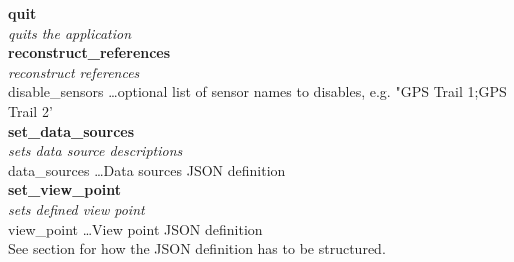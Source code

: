 \textbf{quit} \\
\textit{quits the application} \\

\textbf{reconstruct\_references} \\
\textit{reconstruct references} \\
disable\_sensors \dots optional list of sensor names to disables, e.g. "GPS Trail 1;GPS Trail 2' \\

\textbf{set\_data\_sources} \\
\textit{sets data source descriptions} \\
data\_sources \dots Data sources JSON definition \\

\textbf{set\_view\_point} \\
\textit{sets defined view point} \\
view\_point \dots View point JSON definition \\
See section  for how the JSON definition has to be structured. \\








